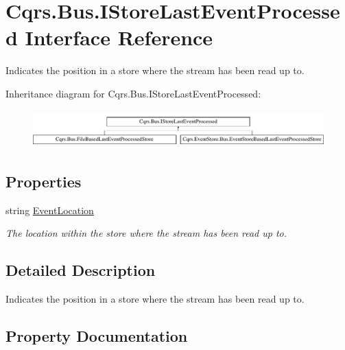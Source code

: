 \hypertarget{interfaceCqrs_1_1Bus_1_1IStoreLastEventProcessed}{}\section{Cqrs.\+Bus.\+I\+Store\+Last\+Event\+Processed Interface Reference}
\label{interfaceCqrs_1_1Bus_1_1IStoreLastEventProcessed}


Indicates the position in a store where the stream has been read up to.  


Inheritance diagram for Cqrs.\+Bus.\+I\+Store\+Last\+Event\+Processed\+:\begin{figure}[H]
\begin{center}
\leavevmode
\includegraphics[height=1.462141cm]{interfaceCqrs_1_1Bus_1_1IStoreLastEventProcessed}
\end{center}
\end{figure}
\subsection*{Properties}
\begin{DoxyCompactItemize}
\item 
string \hyperlink{interfaceCqrs_1_1Bus_1_1IStoreLastEventProcessed_a4273c4f0bd5703d5eec2c0625436ed69_a4273c4f0bd5703d5eec2c0625436ed69}{Event\+Location}
\begin{DoxyCompactList}\small\item\em The location within the store where the stream has been read up to. \end{DoxyCompactList}\end{DoxyCompactItemize}


\subsection{Detailed Description}
Indicates the position in a store where the stream has been read up to. 



\subsection{Property Documentation}
\mbox{\label{interfaceCqrs_1_1Bus_1_1IStoreLastEventProcessed_a4273c4f0bd5703d5eec2c0625436ed69_a4273c4f0bd5703d5eec2c0625436ed69}} 
